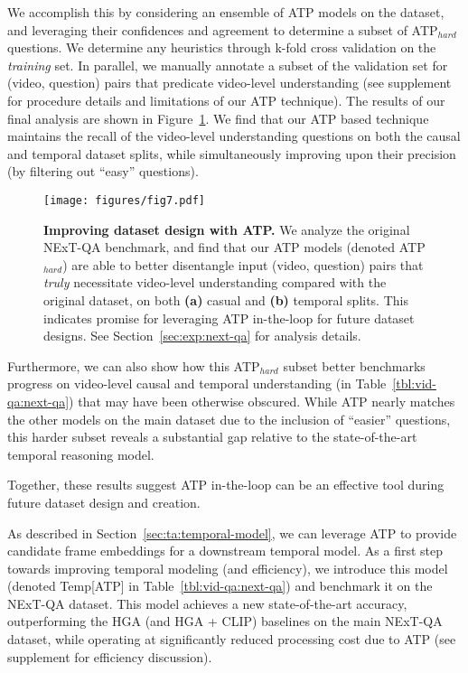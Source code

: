 We accomplish this by considering an ensemble of ATP models on the dataset, and leveraging their confidences and agreement to determine a subset of ATP$_{hard}$ questions. We determine any heuristics through k-fold cross validation on the \textit{training} set. In parallel, we manually annotate a subset of the validation set for (video, question) pairs that predicate video-level understanding (see supplement for procedure details and limitations of our ATP technique). The results of our final analysis are shown in Figure~\ref{fig:exp-nextqa-disentanglement}. We find that our ATP based technique maintains the recall of the video-level understanding questions on both the causal and temporal dataset splits, while simultaneously improving upon their precision (by filtering out ``easy'' questions). 



\begin{figure}[t]
\begin{center}
\centerline{\texttt{[image: figures/fig7.pdf]}}
\vskip -0.1in
\caption{\textbf{Improving dataset design with ATP.} We analyze the original NExT-QA \cite{xiao2021next} benchmark, and find that our ATP models (denoted ATP$_{hard}$) are able to better disentangle input (video, question) pairs that \textit{truly} necessitate video-level understanding compared with the original dataset, on both \textbf{(a)} casual and \textbf{(b)} temporal splits. This indicates promise for leveraging ATP in-the-loop for future dataset designs. See Section~\ref{sec:exp:next-qa} for analysis details.
}
\label{fig:exp-nextqa-disentanglement}
\end{center}
\vskip -0.3in
\end{figure}

Furthermore, we can also show how this ATP$_{hard}$ subset better benchmarks progress on video-level causal and temporal understanding (in Table~\ref{tbl:vid-qa:next-qa}) that may have been otherwise obscured. While ATP nearly matches the other models on the main dataset due to the inclusion  of ``easier'' questions, this harder subset reveals a substantial gap relative to the state-of-the-art temporal reasoning model. 

Together, these results suggest ATP in-the-loop can be an effective tool during future dataset design and creation.

 As described in Section~\ref{sec:ta:temporal-model}, we can leverage ATP to provide candidate frame embeddings for a downstream temporal model. As a first step towards improving temporal modeling (and efficiency), we introduce this model (denoted Temp[ATP] in Table~\ref{tbl:vid-qa:next-qa}) and benchmark it on the NExT-QA dataset. This model achieves a new state-of-the-art accuracy, outperforming the HGA (and HGA + CLIP) baselines on the main NExT-QA dataset, while operating at significantly reduced processing cost due to ATP (see supplement for efficiency discussion).

